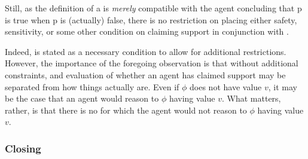 \begin{note}
  Still, as the definition of a \sink{} is \emph{merely} compatible with the agent concluding that p is true when p is (actually) false, there is no restriction on placing either safety, sensitivity, or some other condition on claiming support in conjunction with \ideaS{}.

  Indeed, \ideaS{} is stated as a necessary condition to allow for additional restrictions.
  However, the importance of the foregoing observation is that without additional constraints, and evaluation of whether an agent has claimed support may be separated from how things actually are.
  Even if \(\phi\) does not have value \(v\), it may be the case that an agent would reason to \(\phi\) having value \(v\).
  What matters, rather, is that there is no \epPN{} for which the agent would not reason to \(\phi\) having value \(v\).
\end{note}

\subsubsection{Closing \ideaS{}}
\label{sec:ideaS:closing}

